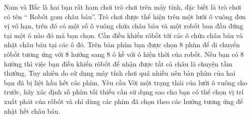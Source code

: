 Nam và  Bắc là hai bạn rất ham chơi trò chơi trên máy tính, đặc biết là trò chơi có tên “ Robốt gom châu báu”. Trò chơi được thể hiện trên một lưới ô vuông đơn vị vô hạn, trên đó có một số ô vuông chứa châu báu và một robốt ban đầu đứng tại một ô nào đó mà bạn chọn. Cần điều khiển rôbốt tới các ô chứa châu báu và nhặt châu báu tại các ô đó. Trên bàn phím bạn được chọn 8 phím để di chuyển rôbốt tương ứng với 8 hướng sang 8 ô kề với ô hiện thời của robốt. Nếu bạn có 8 hướng thì việc bạn điều khiển rôbốt để nhận được tất cả châu là chuyện tầm thường. Tuy nhiên do sử dụng máy tính chơi quá nhiều nên bàn phím của hai bạn đã bị liệt hầu hết các phím.
Yêu cầu
Với một trạng thái của lưới ô vuông cho trước, hãy xác định số phím tối thiểu cần sử dụng sao cho bạn có thể chọn vị trí xuất phát của rôbốt và chỉ dùng các phím đã chọn theo các hướng tương ứng để nhặt hết châu báu.